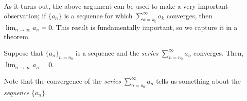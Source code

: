 \documentclass{ximera}
\begin{document}
As it turns out, the above argument can be used to make a very important observation; if $\{a_n\}$ is a sequence for which $\sum_{k=k_0}^{\infty} a_k$ converges, then $\lim_{n \to \infty} a_n =0$.  This result is fundamentally important, so we capture it in a theorem.

\begin{theorem}
Suppose that $\{a_n\}_{n=n_0}$ is a sequence and the \emph{series} $\sum_{n=n_0}^{\infty} a_n$ converges.  Then, $\lim_{n \to \infty} a_n =0$.   
\end{theorem}

\begin{remark}
Note that the convergence of the \emph{series} $\sum_{n=n_0}^{\infty} a_n$ tells us something about the \emph{sequence} $\{a_n\}$.
\end{remark}
\end{document}
